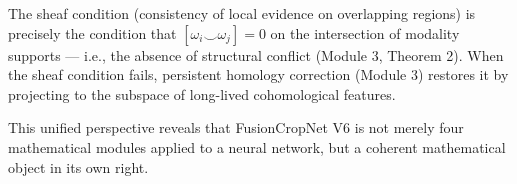 The sheaf condition (consistency of local evidence on overlapping regions) is
precisely the condition that $[\omega_i \smile \omega_j] = 0$ on the intersection
of modality supports — i.e., the absence of structural conflict (Module 3,
Theorem 2). When the sheaf condition fails, persistent homology correction
(Module 3) restores it by projecting to the subspace of long-lived
cohomological features.

This unified perspective reveals that FusionCropNet V6 is not merely four
mathematical modules applied to a neural network, but a coherent mathematical
object in its own right.
